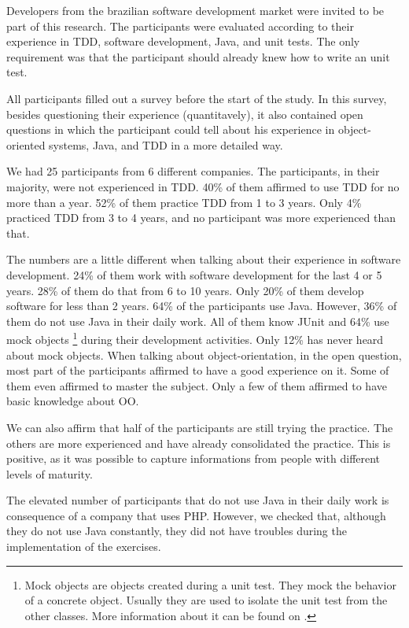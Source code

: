 \documentclass[conference]{IEEEtran}
\begin{document}
Developers from the brazilian software development market were invited to be part
of this research. The participants were evaluated according to their experience in TDD,
software development, Java, and unit tests. The only requirement was that the participant
should already knew how to write an unit test.

All participants filled out a survey before the start of the study. In this survey,
besides questioning their experience (quantitavely), it also contained open questions in which
the participant could tell about his experience in object-oriented systems, Java, and
TDD in a more detailed way.

We had 25 participants from 6 different companies. The participants, in their majority,
were not experienced in TDD. 40\% of them affirmed to use TDD for no more than a year.
52\% of them practice TDD from 1 to 3 years. Only 4\% practiced TDD from 3 to 4
years, and no participant was more experienced than that.

The numbers are a little different when talking about their experience in software
development. 24\% of them work with software development for the last 4 or 5 years.
28\% of them do that from 6 to 10 years. Only 20\% of them develop software for less
than 2 years. 64\% of the participants use Java. However, 36\% of them do not use
Java in their daily work. All of them know JUnit and 64\% use mock objects 
\footnote{Mock objects are objects created during a unit test. They mock the behavior 
of a concrete object. Usually they are used to isolate the unit test from the other classes. 
More information about it can be found on \cite{mocks}.}
during their development activities.
Only 12\% has never heard about mock objects. When talking about object-orientation,
in the open question, most part of the participants affirmed to have a good experience
on it. Some of them even affirmed to master the subject. Only a few of them affirmed
to have basic knowledge about OO.

We can also affirm that half of the participants are still trying the practice. The others
are more experienced and have already consolidated the practice. This is positive, as it
was possible to capture informations from people with different levels of maturity.

The elevated number of participants that do not use Java in their daily work is consequence
of a company that uses PHP. However, we checked that, although they do not use Java constantly,
they did not have troubles during the implementation of the exercises.
\end{document}
